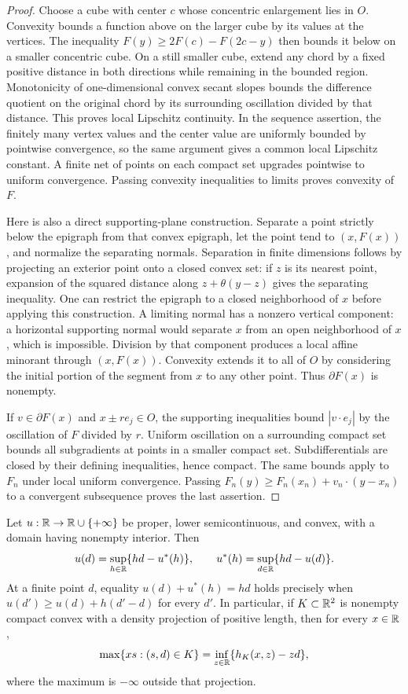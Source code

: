 \begin{proof}
Choose a cube with center $c$ whose concentric enlargement lies in $O$.
Convexity bounds a function above on the larger cube by its values at the
vertices. The inequality
$F(y)\ge 2F(c)-F(2c-y)$ then bounds it below on a smaller concentric cube.
On a still smaller cube, extend any chord by a fixed positive distance in
both directions while remaining in the bounded region. Monotonicity of
one-dimensional convex secant slopes bounds the difference quotient on the
original chord by its surrounding oscillation divided by that distance.
This proves local Lipschitz continuity. In the sequence assertion, the
finitely many vertex values and the center value are uniformly bounded by
pointwise convergence, so the same argument gives a common local Lipschitz
constant. A finite net of points on each compact set upgrades pointwise to
uniform convergence. Passing convexity inequalities to limits proves
convexity of $F$.

Here is also a direct supporting-plane construction. Separate a point
strictly below the epigraph from that convex epigraph, let the point tend to
$(x,F(x))$, and normalize the separating normals. Separation in finite
dimensions follows by projecting an exterior point onto a closed convex set:
if $z$ is its nearest point, expansion of the squared distance along
$z+\theta(y-z)$ gives the separating inequality. One can restrict the
epigraph to a closed neighborhood of $x$ before applying this construction.
A limiting normal has a nonzero vertical component: a horizontal supporting
normal would separate $x$ from an open neighborhood of $x$, which is
impossible. Division by that component produces a local affine minorant
through $(x,F(x))$. Convexity extends it to all of $O$ by considering the
initial portion of the segment from $x$ to any other point. Thus
$\partial F(x)$ is nonempty.

If $v\in\partial F(x)$ and $x\pm re_j\in O$, the supporting inequalities
bound $|v\cdot e_j|$ by the oscillation of $F$ divided by $r$.
Uniform oscillation on a surrounding compact set bounds all subgradients
at points in a smaller compact set. Subdifferentials are closed by their
defining inequalities, hence compact. The same bounds apply to $F_n$ under
local uniform convergence. Passing
$F_n(y)\ge F_n(x_n)+v_n\cdot(y-x_n)$ to a convergent subsequence proves the
last assertion.
\end{proof}

\begin{lemma}\label{lem:elementary-conjugacy}
Let $u:\mathbb R\to\mathbb R\cup\{+\infty\}$ be proper, lower semicontinuous, and convex,
with a domain having nonempty interior. Then
\[
 u(d)=\sup_{h\in\mathbb R}\{hd-u^*(h)\},\qquad
 u^*(h)=\sup_{d\in\mathbb R}\{hd-u(d)\}.
\]
At a finite point $d$, equality $u(d)+u^*(h)=hd$ holds precisely when
$u(d')\ge u(d)+h(d'-d)$ for every $d'$. In particular, if $K\subset\mathbb R^2$
is nonempty compact convex with a density projection of positive length,
then for every $x\in\mathbb R$,
\[
 \max\{xs:(s,d)\in K\}
 =\inf_{z\in\mathbb R}\{h_K(x,z)-zd\},
\]
where the maximum is $-\infty$ outside that projection.
\end{lemma}

